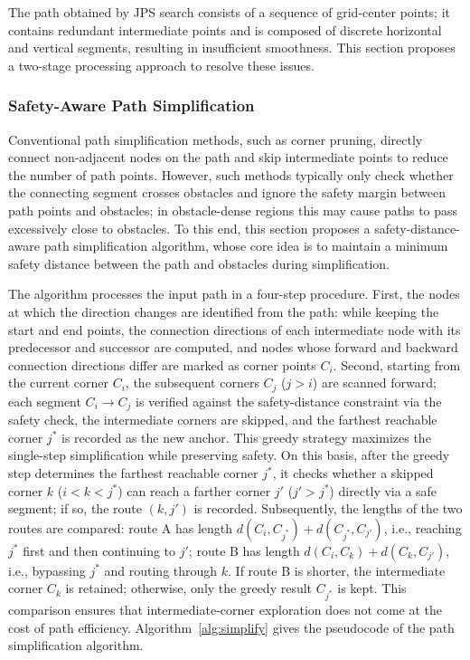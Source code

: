 The path obtained by JPS search consists of a sequence of grid-center points; it contains redundant intermediate points and is composed of discrete horizontal and vertical segments, resulting in insufficient smoothness. This section proposes a two-stage processing approach to resolve these issues.

\subsubsection{Safety-Aware Path Simplification}

Conventional path simplification methods, such as corner pruning, directly connect non-adjacent nodes on the path and skip intermediate points to reduce the number of path points. However, such methods typically only check whether the connecting segment crosses obstacles and ignore the safety margin between path points and obstacles; in obstacle-dense regions this may cause paths to pass excessively close to obstacles. To this end, this section proposes a safety-distance-aware path simplification algorithm, whose core idea is to maintain a minimum safety distance between the path and obstacles during simplification.

The algorithm processes the input path in a four-step procedure. First, the nodes at which the direction changes are identified from the path: while keeping the start and end points, the connection directions of each intermediate node with its predecessor and successor are computed, and nodes whose forward and backward connection directions differ are marked as corner points $C_i$. Second, starting from the current corner $C_i$, the subsequent corners $C_j$ ($j > i$) are scanned forward; each segment $C_i \to C_j$ is verified against the safety-distance constraint via the safety check, the intermediate corners are skipped, and the farthest reachable corner $j^{*}$ is recorded as the new anchor. This greedy strategy maximizes the single-step simplification while preserving safety. On this basis, after the greedy step determines the farthest reachable corner $j^{*}$, it checks whether a skipped corner $k$ ($i < k < j^{*}$) can reach a farther corner $j'$ ($j' > j^{*}$) directly via a safe segment; if so, the route $(k, j')$ is recorded. Subsequently, the lengths of the two routes are compared: route A has length $d(C_i, C_{j^{*}}) + d(C_{j^{*}}, C_{j'})$, i.e., reaching $j^{*}$ first and then continuing to $j'$; route B has length $d(C_i, C_k) + d(C_k, C_{j'})$, i.e., bypassing $j^{*}$ and routing through $k$. If route B is shorter, the intermediate corner $C_k$ is retained; otherwise, only the greedy result $C_{j^{*}}$ is kept. This comparison ensures that intermediate-corner exploration does not come at the cost of path efficiency. Algorithm~\textcolor{blue}{\ref{alg:simplify}} gives the pseudocode of the path simplification algorithm.

